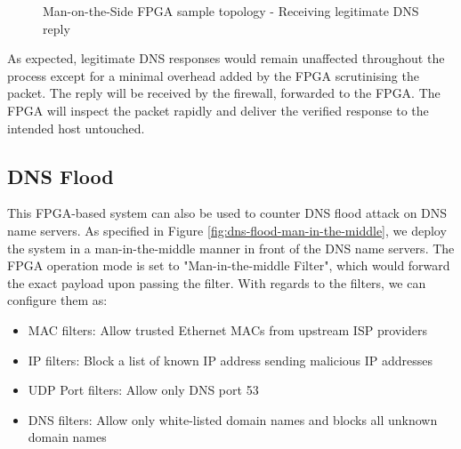 \documentclass[a4paper]{report}
\begin{document}
\begin{figure}[H]
  \caption{Man-on-the-Side FPGA sample topology - Receiving legitimate DNS reply}
\end{figure}

As expected, legitimate DNS responses would remain unaffected throughout the process except for a minimal overhead added by the FPGA scrutinising the packet. The reply will be received by the firewall, forwarded to the FPGA. The FPGA will inspect the packet rapidly and deliver the verified response to the intended host untouched.

\subsection{DNS Flood}

This FPGA-based system can also be used to counter DNS flood attack on DNS name servers. As specified in Figure \ref{fig:dns-flood-man-in-the-middle}, we deploy the system in a man-in-the-middle manner in front of the DNS name servers. The FPGA operation mode is set to "Man-in-the-middle Filter", which would forward the exact payload upon passing the filter. With regards to the filters, we can configure them as:

\begin{itemize}
    \item MAC filters: Allow trusted Ethernet MACs from upstream ISP providers
    \item IP filters: Block a list of known IP address sending malicious IP addresses
    \item UDP Port filters: Allow only DNS port 53
    \item DNS filters: Allow only white-listed domain names and blocks all unknown domain names
\end{itemize}
\end{document}
